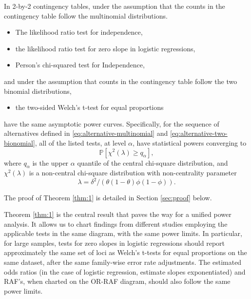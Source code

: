 \begin{theorem} \label{thm:1}
In 2-by-2 contingency tables, under the assumption that the counts in the contingency table follow the multinomial distributions.
\begin{itemize}
    \item The likelihood ratio test for independence,
    \item the likelihood ratio test for zero slope in logistic regressions,
    \item Person's chi-squared test for Independence,
\end{itemize}
and under the assumption that counts in the contingency table follow the two binomial distributions, 
\begin{itemize}
    \item the two-sided Welch's t-test for equal proportions 
\end{itemize} 
have the same asymptotic power curves.
Specifically, for the sequence of alternatives defined in \eqref{eq:alternative-multinomial} and \eqref{eq:alternative-two-bionomial}, all of the listed tests, at level $\alpha$, have statistical powers converging to 
\begin{equation} \label{eq:power-approx}
    \mathbb P[\chi^2(\lambda) \ge q_{\alpha}],
\end{equation}
where $q_{\alpha}$ is the upper $\alpha$ quantile of the central chi-square distribution, and $\chi^2(\lambda)$ is a non-central chi-square distribution with non-centrality parameter
\begin{equation} \label{eq:non-centrality}
    \lambda = \delta^2/{(\theta(1-\theta)\phi(1-\phi))}.
\end{equation}
\end{theorem}

The proof of Theorem \ref{thm:1} is detailed in Section \ref{sec:proof} below.

Theorem \ref{thm:1} is the central result that paves the way for a unified power analysis.
It allows us to chart findings from different studies employing the applicable tests in the same diagram, with the same power limits.
In particular, for large samples, tests for zero slopes in logistic regressions should report approximately the same set of loci as Welch's t-tests for equal proportions on the same dataset, after the same family-wise error rate adjustments.
The estimated odds ratios (in the case of logistic regression, estimate slopes exponentiated) and RAF's, when charted on the OR-RAF diagram, should also follow the same power limits.

